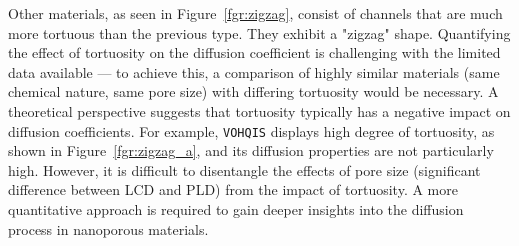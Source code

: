 \documentclass[main]{subfiles}
\begin{document}
Other materials, as seen in Figure~\ref{fgr:zigzag}, consist of channels that are much more tortuous than the previous type. They exhibit a "zigzag" shape. Quantifying the effect of tortuosity on the diffusion coefficient is challenging with the limited data available --- to achieve this, a comparison of highly similar materials (same chemical nature, same pore size) with differing tortuosity would be necessary. A theoretical perspective suggests that tortuosity typically has a negative impact on diffusion coefficients. For example, \texttt{VOHQIS} displays high degree of tortuosity, as shown in Figure~\ref{fgr:zigzag_a}, and its diffusion properties are not particularly high. However, it is difficult to disentangle the effects of pore size (significant difference between LCD and PLD) from the impact of tortuosity. A more quantitative approach is required to gain deeper insights into the diffusion process in nanoporous materials. 
\end{document}
